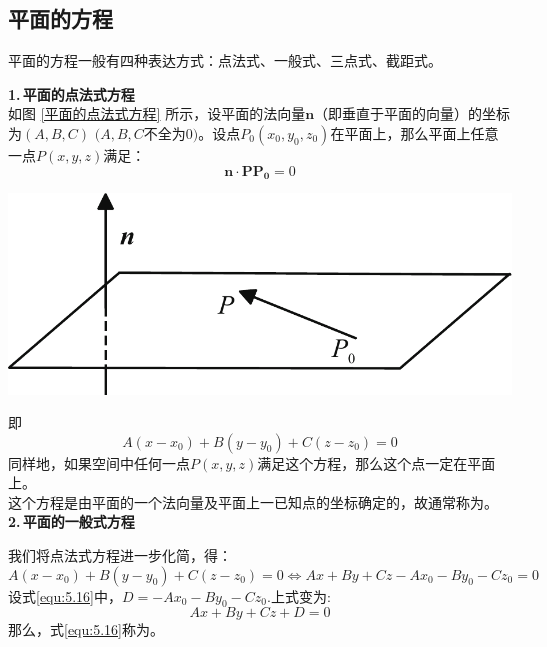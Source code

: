 \subsection{平面的方程}
平面的方程一般有四种表达方式：点法式、一般式、三点式、截距式。
\vspace*{1em}

\noindent
\begin{minipage}{0.6\linewidth}
\textbf{1.$\,$平面的点法式方程}\\ 
\hspace*{2em}如图 \ref{平面的点法式方程} 所示，设平面的法向量$\boldsymbol{n}$（即垂直于平面的向量）的坐标为$(A,B,C)$ $(A,B,C$不全为$0)$。设点$P_0(x_0,y_0,z_0)$在平面上，那么平面上任意一点$P(x,y,z)$满足：
\begin{equation}
	\nonumber
	\boldsymbol{n}\cdot\boldsymbol{PP_0}=0
\end{equation}
\end{minipage}
\begin{minipage}{0.4\linewidth}
	\centering
	\includegraphics[width = 0.9\linewidth]{pic/C-5/plane1}
	\vspace*{-1em}
	\label{平面的点法式方程}
\end{minipage}

\noindent 即
\begin{equation}
	A(x-x_0)+B(y-y_0)+C(z-z_0)=0
	\end{equation}
同样地，如果空间中任何一点$P(x,y,z)$满足这个方程，那么这个点一定在平面上。
\\这个方程是由平面的一个法向量及平面上一已知点的坐标确定的，故通常称为。\\[1em]
\textbf{2.$\,$平面的一般式方程}
\par 我们将点法式方程进一步化简，得：
\begin{equation}
	A(x-x_0)+B(y-y_0)+C(z-z_0)=0\Leftrightarrow Ax+By+Cz-Ax_0-By_0-Cz_0=0
	\label{equ:5.16}
\end{equation}
设式\eqref{equ:5.16}中，$D=-Ax_0-By_0-Cz_0$.上式变为:
\begin{equation}
	Ax+By+Cz+D=0
\end{equation}
那么，式\eqref{equ:5.16}称为。\\

